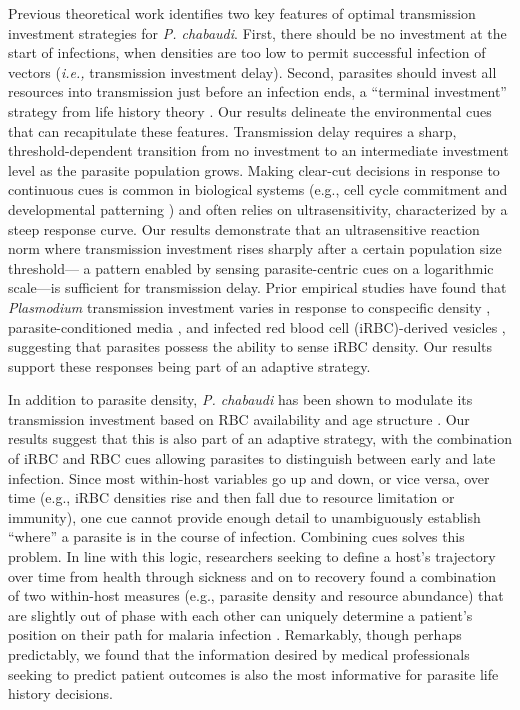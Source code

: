 \documentclass[10pt,letterpaper]{article}
\begin{document}
Previous theoretical work identifies two key features of optimal transmission investment strategies for \emph{P. chabaudi}\cite{greischar_predicting_2016}. First, there should be no investment at the start of infections, when densities are too low to permit successful infection of vectors (\emph{i.e.,} transmission investment delay). Second, parasites should invest all resources into transmission just before an infection ends, a ``terminal investment'' strategy from life history theory \cite{carter_stress_2013}. Our results delineate the environmental cues that can recapitulate these features. Transmission delay requires a sharp, threshold-dependent transition from no investment to an intermediate investment level as the parasite population grows. Making clear-cut decisions in response to continuous cues is common in biological systems (e.g., cell cycle commitment \cite{charvin_origin_2010} and developmental patterning \cite{melen_threshold_2005}) and often relies on ultrasensitivity, characterized by a steep response curve. Our results demonstrate that an ultrasensitive reaction norm where transmission investment rises sharply after a certain population size threshold--- a pattern enabled by sensing parasite-centric cues on a logarithmic scale---is sufficient for transmission delay. Prior empirical studies have found that \emph{Plasmodium} transmission investment varies in response to conspecific density \cite{pollitt_competition_2011,cameron_plasticity_2013}, parasite-conditioned media \cite{williams_stimulation_1999, dyer_regulation_2003}, and infected red blood cell (iRBC)-derived vesicles \cite{mantel_malaria-infected_2013}, suggesting that parasites possess the ability to sense iRBC density. Our results support these responses being part of an adaptive strategy. \newline

In addition to parasite density, \emph{P. chabaudi} has been shown to modulate its transmission investment based on RBC availability and age structure \cite{trager_enhanced_1992, trager_plasmodium_1999, reece_host_2005, birget_phenotypic_2017, schneider_adaptive_2018}. Our results suggest that this is also part of an adaptive strategy, with the combination of iRBC and RBC cues allowing parasites to distinguish between early and late infection. Since most within-host variables go up and down, or vice versa, over time (e.g., iRBC densities rise and then fall due to resource limitation or immunity), one cue cannot provide enough detail to unambiguously establish ``where'' a parasite is in the course of infection. Combining cues solves this problem. In line with this logic, researchers seeking to define a host’s trajectory over time from health through sickness and on to recovery \cite{schneider_tracing_2011} found a combination of two within-host measures (e.g., parasite density and resource abundance) that are slightly out of phase with each other can uniquely determine a patient’s position on their path for malaria infection \cite{torres_tracking_2016}. Remarkably, though perhaps predictably, we found that the information desired by medical professionals seeking to predict patient outcomes is also the most informative for parasite life history decisions.\newline
\end{document}
